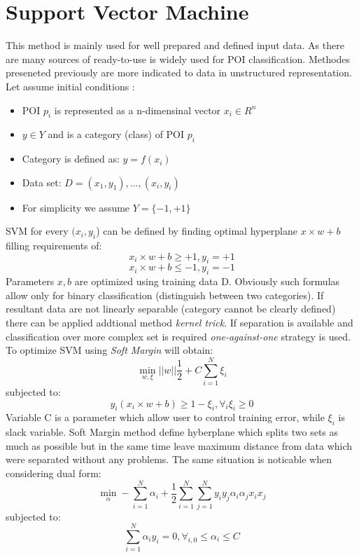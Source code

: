 \section{Support Vector Machine}
This method is mainly used for well prepared and defined input data. As there are many sources of ready-to-use is widely used for POI classification. Methodes preseneted previously are more indicated to data in unstructured representation. Let assume initial conditions \cite{6}:
\begin{itemize}
	\item POI $p_i$ is represented as a n-dimensinal vector $x_i \in R^n$
	\item $y \in Y$ and is a category (class) of POI $p_i$
	\item Category is defined as: $y=f(x_i)$
	\item Data set: $D={(x_1,y_1),...,(x_i,y_i)}$
	\item For simplicity we assume $Y=\{-1,+1\}$
\end{itemize}
SVM for every $(x_i,y_i$) can be defined by finding optimal hyperplane $x \times w + b$ filling requirements of:
\begin{equation}
x_i \times w + b \geq +1, y_i= +1
\end{equation}
\begin{equation}
x_i \times w + b \leq -1, y_i= -1
\end{equation}
Parameters $x,b$ are optimized using training data D. Obviously such formulas allow only for binary classification (distinguish between two categories). If resultant data are not linearly separable (category cannot be clearly defined) there can be applied addtional method \textit{kernel trick}. If separation is available and classification over more complex set is required \textit{one-against-one}\cite{7} strategy is used. To optimize SVM using \textit{Soft Margin} will obtain:
\begin{equation}
\min_{w,\xi} ||w||\frac{1}{2} + C\sum_{i=1}^{N}\xi_i
\end{equation}
subjected to:
\begin{equation}
y_i (x_i \times w + b) \geq 1 - \xi_i,  \forall_i \xi_i \geq 0
\end{equation}
Variable C is a parameter which allow user to control training error, while $\xi_i$ is slack variable. Soft Margin method define hyberplane which splits two sets as much as possible but in the same time leave maximum distance from data which were separated without any problems.\cite{7}
The same situation is noticable when considering dual form:
\begin{equation}
\min_\alpha - \sum_{i=1}^{N}\alpha_i + \frac{1}{2}\sum_{i=1}^{N}\sum_{j=1}^{N}y_iy_j\alpha_i\alpha_jx_ix_j
\end{equation}
subjected to:
\begin{equation}
\sum_{i=1}^{N}\alpha_iy_i=0, \forall_{i,0} \leq \alpha_i \leq C
\end{equation}
